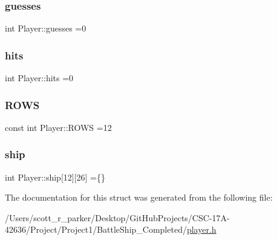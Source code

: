 \mbox{\label{struct_player_aa786f3096665b656ab564841a75ffebd}} 
\subsubsection{\texorpdfstring{guesses}{guesses}}
{\footnotesize\ttfamily int Player\+::guesses =0}

\mbox{\label{struct_player_a052222bcdb49688a6a4afa2687498db4}} 
\subsubsection{\texorpdfstring{hits}{hits}}
{\footnotesize\ttfamily int Player\+::hits =0}

\mbox{\label{struct_player_a05e8513ffc24371b5c242ef17b5cfba1}} 
\subsubsection{\texorpdfstring{R\+O\+WS}{ROWS}}
{\footnotesize\ttfamily const int Player\+::\+R\+O\+WS =12}

\mbox{\label{struct_player_acee20c03cd87a5596defc5bf0f1bd77e}} 
\subsubsection{\texorpdfstring{ship}{ship}}
{\footnotesize\ttfamily int Player\+::ship\mbox{[}12\mbox{]}\mbox{[}26\mbox{]} =\{\}}



The documentation for this struct was generated from the following file\+:\begin{DoxyCompactItemize}
\item 
/\+Users/scott\+\_\+r\+\_\+parker/\+Desktop/\+Git\+Hub\+Projects/\+C\+S\+C-\/17\+A-\/42636/\+Project/\+Project1/\+Battle\+Ship\+\_\+\+Completed/\hyperlink{player_8h}{player.\+h}\end{DoxyCompactItemize}
